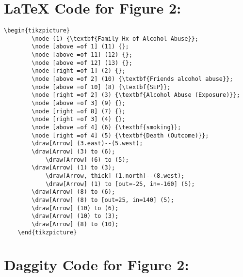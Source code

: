 \documentclass{article}
\begin{document}
\section*{\LaTeX\hspace*{1mm} Code for Figure 2:}
\begin{lstlisting}[frame=single, basicstyle=\ttfamily]
    \begin{tikzpicture}
        \node (1) {\textbf{Family Hx of Alcohol Abuse}};
        \node [above =of 1] (11) {};
        \node [above =of 11] (12) {};
        \node [above =of 12] (13) {};
        \node [right =of 1] (2) {};
        \node [above =of 2] (10) {\textbf{Friends alcohol abuse}};
        \node [above =of 10] (8) {\textbf{SEP}};
        \node [right =of 2] (3) {\textbf{Alcohol Abuse (Exposure)}};
        \node [above =of 3] (9) {};
        \node [right =of 8] (7) {};
        \node [right =of 3] (4) {};
        \node [above =of 4] (6) {\textbf{smoking}};
        \node [right =of 4] (5) {\textbf{Death (Outcome)}};
        \draw[Arrow] (3.east)--(5.west);
        \draw[Arrow] (3) to (6);
            \draw[Arrow] (6) to (5);
        \draw[Arrow] (1) to (3);
            \draw[Arrow, thick] (1.north)--(8.west);
            \draw[Arrow] (1) to [out=-25, in=-160] (5);
        \draw[Arrow] (8) to (6);
        \draw[Arrow] (8) to [out=25, in=140] (5);
        \draw[Arrow] (10) to (6);
        \draw[Arrow] (10) to (3);
        \draw[Arrow] (8) to (10);
    \end{tikzpicture}
    \end{lstlisting}

    \section*{Daggity Code for Figure 2:}
\begin{lstlisting}[frame=single, basicstyle=\ttfamily]
\end{lstlisting}
    
\end{document}
